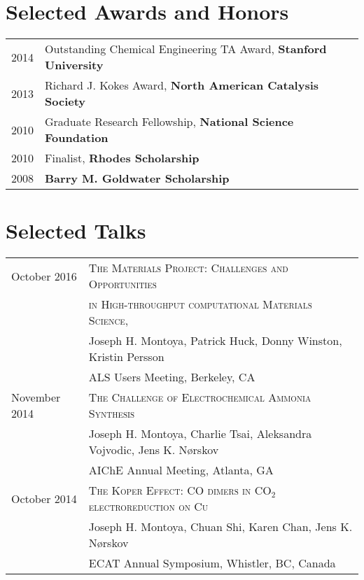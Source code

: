 \documentclass[a4paper,10pt]{article}
\begin{document}
\section{Selected Awards and Honors}
\begin{tabular}{ll}
2014 & Outstanding Chemical Engineering TA Award, \textbf{Stanford University} \\
2013 & Richard J. Kokes Award, \textbf{North American Catalysis Society} \\
2010 & Graduate Research Fellowship, \textbf{National Science Foundation} \\
2010 & Finalist, \textbf{Rhodes Scholarship} \\
2008 & \textbf{Barry M. Goldwater Scholarship} \\
\end{tabular}

\nocite{*}
%
\printbibliography
\section{Selected Talks}
\begin{tabular}{ll}
October 2016 & \textsc{The Materials Project: Challenges and Opportunities}\\
& \textsc{in High-throughput computational Materials Science}, \\
& Joseph H. Montoya, Patrick Huck, Donny Winston, Kristin Persson  \\
& ALS Users Meeting, Berkeley, CA \vspace{0.1in} \\
November 2014 & \textsc{The Challenge of Electrochemical Ammonia Synthesis} \\
& Joseph H. Montoya, Charlie Tsai, Aleksandra Vojvodic, Jens K. N\o rskov \\
& AIChE Annual Meeting, Atlanta, GA \vspace{0.1in} \\
October 2014 & \textsc{The Koper Effect: CO dimers in CO$_2$ electroreduction on Cu}\\
& Joseph H. Montoya, Chuan Shi, Karen Chan, Jens K. N\o rskov\\
& ECAT Annual Symposium, Whistler, BC, Canada \vspace{0.1in} \\
\end{tabular}
\end{document}
